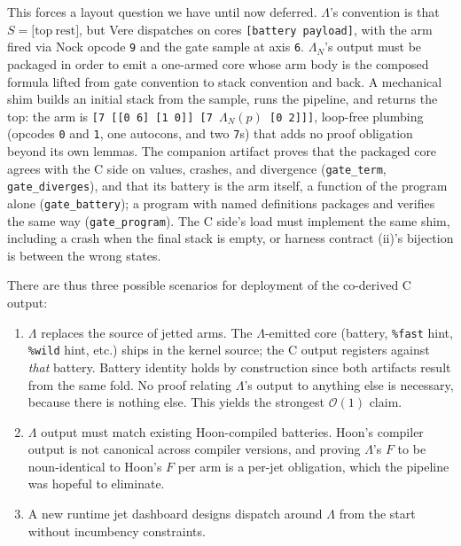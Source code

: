 \documentclass[twoside]{article}
\begin{document}
\noindent
This forces a layout question we have until now deferred.  $\Lambda$'s convention is that $S = \texttt{[}\textrm{top}\ \textrm{rest}\texttt{]}$, but Vere dispatches on cores \lstinline[style=inlinecode]{[battery payload]}, with the arm fired via Nock opcode \lstinline[style=inlinecode]{9} and the gate sample at axis \lstinline[style=inlinecode]{6}.  $\Lambda_N$'s output must be packaged in order to emit a one-armed core whose arm body is the composed formula lifted from gate convention to stack convention and back.  A mechanical shim builds an initial stack from the sample, runs the pipeline, and returns the top:  the arm is \texttt{[7 [[0 6] [1 0]] [7 $\Lambda_N(p)$ [0 2]]]}, loop-free plumbing (opcodes \lstinline[style=inlinecode]{0} and \lstinline[style=inlinecode]{1}, one autocons, and two \lstinline[style=inlinecode]{7}s) that adds no proof obligation beyond its own lemmas.  The companion artifact proves that the packaged core agrees with the C side on values, crashes, and divergence (\lstinline[style=inlinecode]{gate_term}, \lstinline[style=inlinecode]{gate_diverges}), and that its battery is the arm itself, a function of the program alone (\lstinline[style=inlinecode]{gate_battery}); a program with named definitions packages and verifies the same way (\lstinline[style=inlinecode]{gate_program}).  The C side's load must implement the same shim, including a crash when the final stack is empty, or harness contract (ii)'s bijection is between the wrong states.

There are thus three possible scenarios for deployment of the co-derived C output:

\begin{enumerate}
  \item  $\Lambda$ replaces the source of jetted arms.  The $\Lambda$-emitted core (battery, \lstinline[style=inlinecode]{%fast} hint, \lstinline[style=inlinecode]{%wild} hint, etc.) ships in the kernel source; the C output registers against \emph{that} battery.  Battery identity holds by construction since both artifacts result from the same fold.  No proof relating $\Lambda$'s output to anything else is necessary, because there is nothing else.  This yields the strongest $\mathcal{O}(1)$ claim.
  \item  $\Lambda$ output must match existing Hoon-compiled batteries.  Hoon's compiler output is not canonical across compiler versions, and proving $\Lambda$'s $F$ to be noun-identical to Hoon's $F$ per arm is a per-jet obligation, which the pipeline was hopeful to eliminate.
  \item  A new runtime jet dashboard designs dispatch around $\Lambda$ from the start without incumbency constraints.
\end{enumerate}
\end{document}
